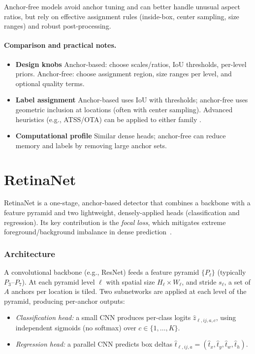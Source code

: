 Anchor-free models avoid anchor tuning and can better handle unusual aspect ratios, but rely on effective assignment rules (inside-box, center sampling, size ranges) and robust post-processing.

\paragraph{Comparison and practical notes.}
\begin{itemize}
    \item \textbf{Design knobs} Anchor-based: choose scales/ratios, IoU thresholds, per-level priors. Anchor-free: choose assignment region, size ranges per level, and optional quality terms.
    \item \textbf{Label assignment} Anchor-based uses $\mathrm{IoU}$ with thresholds; anchor-free uses geometric inclusion at locations (often with center sampling). Advanced heuristics (e.g., ATSS/OTA) can be applied to either family \cite{zhang2020atss,ge2021ota}.
    \item \textbf{Computational profile} Similar dense heads; anchor-free can reduce memory and labels by removing large anchor sets.
\end{itemize}



\section{RetinaNet}


RetinaNet is a one-stage, anchor-based detector that combines a backbone with a feature pyramid and two lightweight, densely-applied heads (classification and regression). Its key contribution is the \emph{focal loss}, which mitigates extreme foreground/background imbalance in dense prediction~\cite{lin2018focalloss}.



\subsubsection{Architecture}
A convolutional backbone (e.g., ResNet) feeds a feature pyramid $\{P_\ell\}$ (typically $P_3$--$P_7$). 
At each pyramid level $\ell$ with spatial size $H_\ell \times W_\ell$, and stride $s_\ell$, a set of $A$ anchors per location is tiled. 
Two subnetworks are applied at each level of the pyramid, producing per-anchor outputs:
\begin{itemize}
    \item \emph{Classification head:} a small CNN produces per-class logits $\hat{z}_{\ell,ij,a,c}$, using independent sigmoids (no softmax) over $c \in \{1,\dots,K\}$.
    \item \emph{Regression head:} a parallel CNN predicts box deltas $\hat{t}_{\ell,ij,a}=(\hat{t}_x,\hat{t}_y,\hat{t}_w,\hat{t}_h)$.
\end{itemize}


